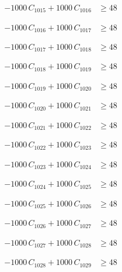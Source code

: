 \documentclass[a4paper,11pt]{article}
\begin{document}
\begin{align}
-1000\,C_{1015} + 1000\,C_{1016} &\geq 48 \nonumber
\end{align}

\begin{align}
-1000\,C_{1016} + 1000\,C_{1017} &\geq 48 \nonumber
\end{align}

\begin{align}
-1000\,C_{1017} + 1000\,C_{1018} &\geq 48 \nonumber
\end{align}

\begin{align}
-1000\,C_{1018} + 1000\,C_{1019} &\geq 48 \nonumber
\end{align}

\begin{align}
-1000\,C_{1019} + 1000\,C_{1020} &\geq 48 \nonumber
\end{align}

\begin{align}
-1000\,C_{1020} + 1000\,C_{1021} &\geq 48 \nonumber
\end{align}

\begin{align}
-1000\,C_{1021} + 1000\,C_{1022} &\geq 48 \nonumber
\end{align}

\begin{align}
-1000\,C_{1022} + 1000\,C_{1023} &\geq 48 \nonumber
\end{align}

\begin{align}
-1000\,C_{1023} + 1000\,C_{1024} &\geq 48 \nonumber
\end{align}

\begin{align}
-1000\,C_{1024} + 1000\,C_{1025} &\geq 48 \nonumber
\end{align}

\begin{align}
-1000\,C_{1025} + 1000\,C_{1026} &\geq 48 \nonumber
\end{align}

\begin{align}
-1000\,C_{1026} + 1000\,C_{1027} &\geq 48 \nonumber
\end{align}

\begin{align}
-1000\,C_{1027} + 1000\,C_{1028} &\geq 48 \nonumber
\end{align}

\begin{align}
-1000\,C_{1028} + 1000\,C_{1029} &\geq 48 \nonumber
\end{align}
\end{document}
